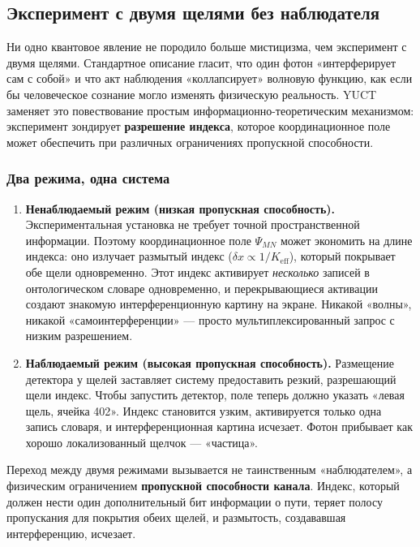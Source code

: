 \documentclass[12pt,a4paper]{article}
\theoremstyle{remark}
\begin{document}
	\subsection{Эксперимент с двумя щелями без наблюдателя}
	
	Ни одно квантовое явление не породило больше мистицизма, чем эксперимент с двумя щелями. Стандартное описание гласит, что один фотон «интерферирует сам с собой» и что акт наблюдения «коллапсирует» волновую функцию, как если бы человеческое сознание могло изменять физическую реальность. YUCT заменяет это повествование простым информационно-теоретическим механизмом: эксперимент зондирует \textbf{разрешение индекса}, которое координационное поле может обеспечить при различных ограничениях пропускной способности.
	
	\subsubsection{Два режима, одна система}
	
	\begin{enumerate}[leftmargin=*]
		\item \textbf{Ненаблюдаемый режим (низкая пропускная способность).}
		Экспериментальная установка не требует точной пространственной информации. Поэтому координационное поле $\Psi_{MN}$ может экономить на длине индекса: оно излучает размытый индекс ($\delta x \propto 1/K_{\mathrm{eff}}$), который покрывает обе щели одновременно. Этот индекс активирует \emph{несколько} записей в онтологическом словаре одновременно, и перекрывающиеся активации создают знакомую интерференционную картину на экране. Никакой «волны», никакой «самоинтерференции» — просто мультиплексированный запрос с низким разрешением.
		
		\item \textbf{Наблюдаемый режим (высокая пропускная способность).}
		Размещение детектора у щелей заставляет систему предоставить резкий, разрешающий щели индекс. Чтобы запустить детектор, поле теперь должно указать «левая щель, ячейка 402». Индекс становится узким, активируется только одна запись словаря, и интерференционная картина исчезает. Фотон прибывает как хорошо локализованный щелчок — «частица».
	\end{enumerate}
	
	Переход между двумя режимами вызывается не таинственным «наблюдателем», а физическим ограничением \textbf{пропускной способности канала}. Индекс, который должен нести один дополнительный бит информации о пути, теряет полосу пропускания для покрытия обеих щелей, и размытость, создававшая интерференцию, исчезает.
	
\end{document}

